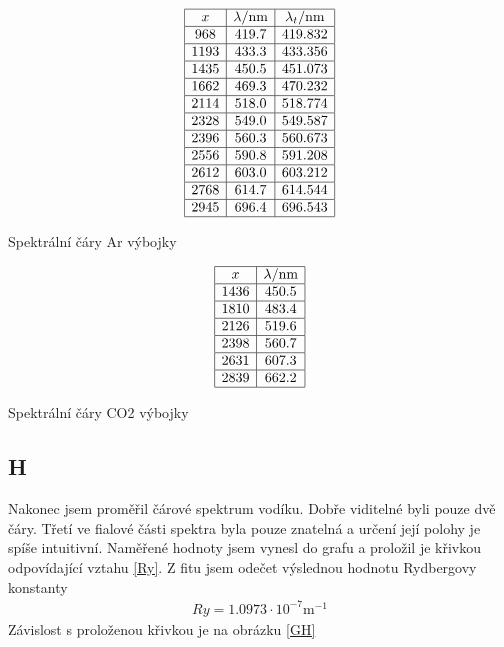\documentclass[a4paper,12pt]{article}
\begin{document}
\begin{table}
$$
\begin{array}{|c|c|c|}
\hline
x&  \lambda/\mbox{nm}&  \lambda_t/\mbox{nm} \\ \hline
968&    419.7&  419.832 \\ \hline
1193&   433.3&  433.356 \\ \hline
1435&   450.5&  451.073 \\ \hline
1662&   469.3&  470.232 \\ \hline
2114&   518.0&  518.774 \\ \hline
2328&   549.0&  549.587 \\ \hline
2396&   560.3&  560.673 \\ \hline
2556&   590.8&  591.208 \\ \hline
2612&   603.0&  603.212 \\ \hline
2768&   614.7&  614.544 \\ \hline
2945&   696.4&  696.543 \\ \hline
\end{array}
$$
\caption{Spektrální čáry Ar výbojky}
\label{TAr}
\end{table}

\begin{table}
$$
\begin{array}{|c|c|}
\hline
x&  \lambda/\mbox{nm} \\ \hline
1436&   450.5 \\ \hline
1810&   483.4 \\ \hline
2126&   519.6 \\ \hline
2398&   560.7 \\ \hline
2631&   607.3 \\ \hline
2839&   662.2 \\ \hline
\end{array}
$$
\caption{Spektrální čáry CO2 výbojky}
\label{TCO2}
\end{table}


\subsection{H}
Nakonec jsem proměřil čárové spektrum vodíku. Dobře viditelné byli pouze dvě čáry. Třetí ve fialové části spektra byla pouze znatelná a určení její polohy je spíše intuitivní. Naměřené hodnoty jsem vynesl do grafu a proložil je křivkou odpovídající vztahu \ref{Ry}. Z fitu jsem odečet výslednou hodnotu Rydbergovy konstanty
\begin{eqnarray}
Ry=1.0973 \cdot 10^{-7}   \mbox{m}^{-1}
\end{eqnarray}
Závislost s proloženou křivkou je na obrázku \ref{GH}
\end{document}
